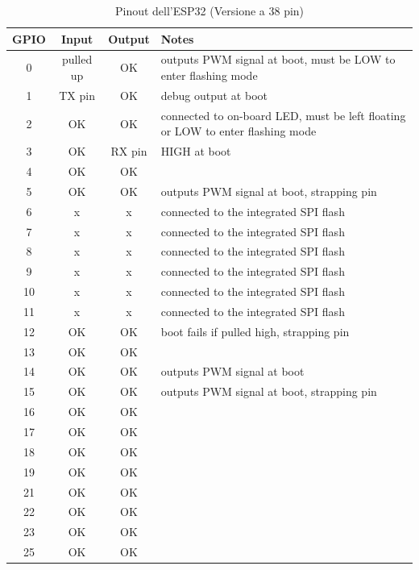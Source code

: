 \documentclass[12pt,a4paper]{report}
\begin{document}
\begin{table}[H]
    \centering
    \caption{Pinout dell'ESP32 (Versione a 38 pin)}
    \label{tab:esp32_pinout}
    \begin{tabular}{|c|c|c|p{8cm}|}
        \hline
        \textbf{GPIO} & \textbf{Input} & \textbf{Output} & \textbf{Notes} \\ \hline
        0 & pulled up & OK & outputs PWM signal at boot, must be LOW to enter flashing mode \\ \hline
        1 & TX pin & OK & debug output at boot \\ \hline
        2 & OK & OK & connected to on-board LED, must be left floating or LOW to enter flashing mode \\ \hline
        3 & OK & RX pin & HIGH at boot \\ \hline
        4 & OK & OK & \\ \hline
        5 & OK & OK & outputs PWM signal at boot, strapping pin \\ \hline
        6 & x & x & connected to the integrated SPI flash \\ \hline
        7 & x & x & connected to the integrated SPI flash \\ \hline
        8 & x & x & connected to the integrated SPI flash \\ \hline
        9 & x & x & connected to the integrated SPI flash \\ \hline
        10 & x & x & connected to the integrated SPI flash \\ \hline
        11 & x & x & connected to the integrated SPI flash \\ \hline
        12 & OK & OK & boot fails if pulled high, strapping pin \\ \hline
        13 & OK & OK & \\ \hline
        14 & OK & OK & outputs PWM signal at boot \\ \hline
        15 & OK & OK & outputs PWM signal at boot, strapping pin \\ \hline
        16 & OK & OK & \\ \hline
        17 & OK & OK & \\ \hline
        18 & OK & OK & \\ \hline
        19 & OK & OK & \\ \hline
        21 & OK & OK & \\ \hline
        22 & OK & OK & \\ \hline
        23 & OK & OK & \\ \hline
        25 & OK & OK & \\ \hline

\end{tabular}
\end{table}
\end{document}
